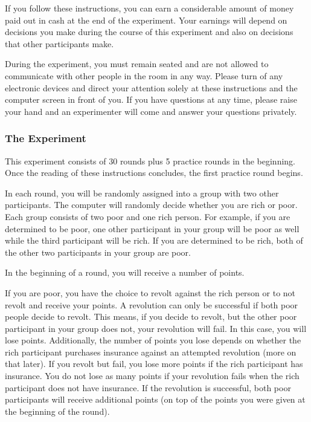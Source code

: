 \documentclass[12pt]{article}
\begin{document}
	If you follow these instructions, you can earn a considerable amount of 
	money paid out in cash at the end of the experiment. Your earnings will 
	depend on decisions you make during the course of this experiment and also 
	on decisions that other participants make.
	
	During the experiment, you must remain seated and are not allowed to 
	communicate with other people in the room in any way. Please turn of any 
	electronic devices and direct your attention solely at these instructions 
	and the computer screen in front of you. If you have questions at any time, 
	please raise your hand and an experimenter will come and answer your 
	questions privately.
	
	\subsubsection*{The Experiment}
	This experiment consists of 30 rounds plus 5 practice rounds in the 
	beginning. Once the reading of these instructions concludes, the first 
	practice round begins.
	
	In each round, you will be randomly assigned into a group with two other 
	participants. The computer will randomly decide whether you are rich or 
	poor. Each group consists of two poor and one rich person. For example, if 
	you are determined to be poor, one other participant in your group will be 
	poor as well while the third participant will be rich. If you are 
	determined to be rich, both of the other two participants in your group are 
	poor.
	
	In the beginning of a round, you will receive a number of points.
	
	If you are poor, you have the choice to revolt against the rich person or 
	to not revolt and receive your points. A revolution 
	can only be successful if both poor people decide to revolt. This means, if 
	you decide to revolt, but the other poor participant in your group does 
	not, your revolution will fail. In this case, you will lose points. 
	Additionally, the number of 
	points you lose depends on whether the rich participant purchases 
	insurance against an attempted revolution (more on that later). If you 
	revolt but fail, you lose more points if the rich participant has 
	insurance. You do not lose as many points if your revolution fails when the 
	rich participant does not have insurance.
	If the revolution is successful, both poor participants will receive 
	additional points (on top of the points you were given at the beginning of 
	the round). 
	
\end{document}
